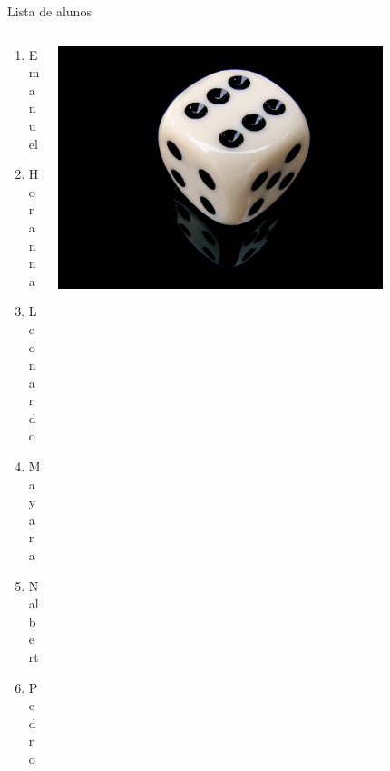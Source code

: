 \documentclass[t, brazilian, 11pt, aspectratio=169]{beamer}
\begin{document}
\begin{frame}{Lista de alunos}
    \begin{columns}[c]
        \begin{column}{0.4\textwidth}
            \begin{enumerate}
                \item Emanuel
                \item Horanna
                \item Leonardo
                \item Mayara
                \item Nalbert
                \item Pedro
            \end{enumerate}
        \end{column}
        \begin{column}{0.4\textwidth}
            \centering
            \includegraphics[width=0.8\textwidth]{../images/dice.jpg}
        \end{column}
    \end{columns}
\end{frame}
\end{document}
